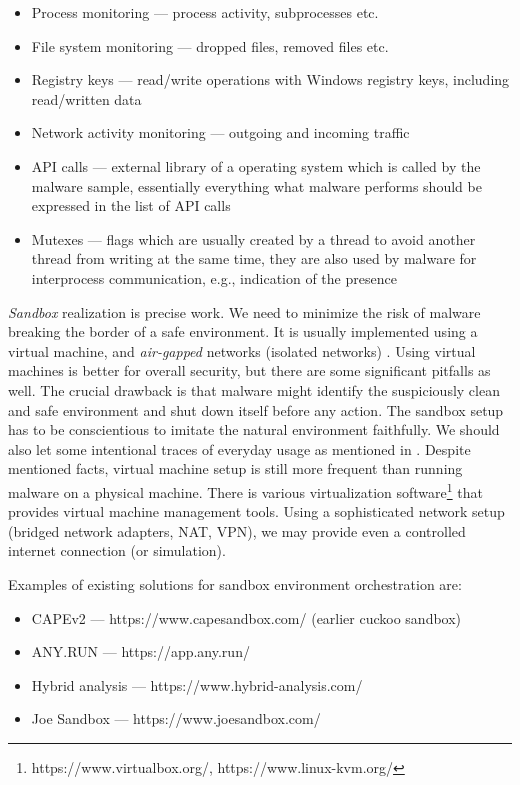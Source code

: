 \begin{itemize}
  \itemsep0em 
  \item Process monitoring --- process activity, subprocesses etc.
  \item File system monitoring --- dropped files, removed files etc.
  \item Registry keys --- read/write operations with Windows registry keys, including read/written data
  \item Network activity monitoring --- outgoing and incoming traffic
  \item API calls --- external library of a operating system which is called by the malware sample, essentially everything what malware performs should be expressed in the list of API calls
  \item Mutexes --- flags which are usually created by a thread to avoid another thread from writing at the same time, they are also used by malware for interprocess communication, e.g.,  indication of the presence
\end{itemize}

\emph{Sandbox} realization is precise work. We need to minimize the risk of malware breaking the border of a safe environment. It is usually implemented using a virtual machine, and \emph{air-gapped} networks (isolated networks) \cite{Sikorski2012}. Using virtual machines is better for overall security, but there are some significant pitfalls as well. The crucial drawback is that malware might identify the suspiciously clean and safe environment and shut down itself before any action. The sandbox setup has to be conscientious to imitate the natural environment faithfully. We should also let some intentional traces of everyday usage as mentioned in \cite{CAPESand75:online}. Despite mentioned facts, virtual machine setup is still more frequent than running malware on a physical machine. There is various virtualization software\footnote{https://www.virtualbox.org/, https://www.linux-kvm.org/} that provides virtual machine management tools. Using a sophisticated network setup (bridged network adapters, NAT, VPN), we may provide even a controlled internet connection (or simulation).

Examples of existing solutions for sandbox environment orchestration are:
\begin{itemize}
  \itemsep0em 
  \item CAPEv2 --- https://www.capesandbox.com/ (earlier cuckoo sandbox)
  \item ANY.RUN --- https://app.any.run/
  \item Hybrid analysis --- https://www.hybrid-analysis.com/
  \item Joe Sandbox --- https://www.joesandbox.com/
\end{itemize}


